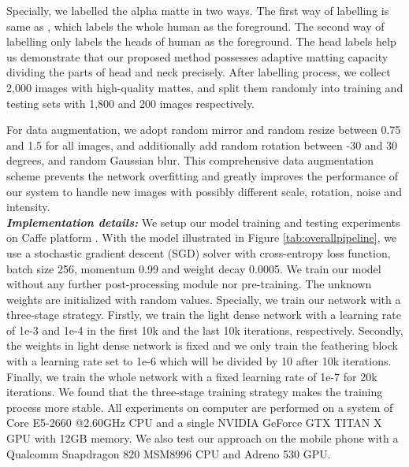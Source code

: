 \documentclass[sigconf]{acmart}
\begin{document}
Specially, we labelled the alpha matte in two ways. The first way of labelling is same as \cite{shen2016deep, xu2017deep}, which labels the whole human as the foreground. The second way of labelling only labels the heads of human as the foreground. The head labels help us demonstrate that our proposed method possesses adaptive matting capacity dividing the parts of head and neck precisely. After labelling process, we collect 2,000 images with high-quality mattes, and split them randomly into training and testing sets with 1,800 and 200 images respectively.

For data augmentation, we adopt random mirror and random resize between 0.75 and 1.5 for all images, and additionally add random rotation between -30 and 30 degrees, and random Gaussian blur. This comprehensive data augmentation scheme prevents the network overfitting and greatly improves the performance of our system to handle new images with possibly different scale, rotation, noise and intensity. \\
\textbf{\emph{Implementation details:}} We setup our model training and testing experiments on Caffe platform \cite{jia2014caffe}. With the model illustrated in Figure \ref{tab:overallpipeline}, we use a stochastic gradient descent (SGD) solver with cross-entropy loss function, batch size 256, momentum 0.99 and weight decay 0.0005. We train our model without any further post-processing module nor pre-training. The unknown weights are initialized with random values. Specially, we train our network with a three-stage strategy. Firstly, we train the light dense network with a learning rate of 1e-3 and 1e-4 in the first 10k and the last 10k iterations, respectively. Secondly, the weights in light dense network is fixed and we only train the feathering block with a learning rate set to 1e-6 which will be divided by 10 after 10k iterations. Finally, we train the whole network with a fixed learning rate of 1e-7 for 20k iterations. We found that the three-stage training strategy makes the training process more stable. All experiments on computer are performed on a system of Core E5-2660 @2.60GHz CPU and a single NVIDIA GeForce GTX TITAN X GPU with 12GB memory. We also test our approach on the mobile phone with a Qualcomm Snapdragon 820 MSM8996 CPU and Adreno 530 GPU.
\end{document}
